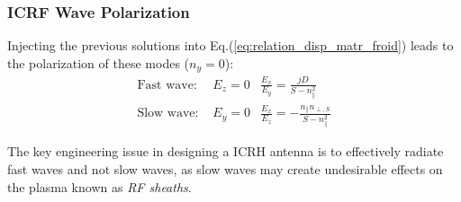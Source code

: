 \subsubsection{ICRF Wave Polarization}
Injecting the previous solutions into Eq.(\ref{eq:relation_disp_matr_froid}) leads to the polarization of these modes ($n_y=0$):
\begin{subequations}
	\begin{eqnarray}
		\mbox{Fast wave: } & E_z = 0 & \frac{E_x}{E_y}=\frac{j D}{S - n_\parallel^2} \\
		\mbox{Slow wave: } & E_y = 0 & \frac{E_x}{E_z}=- \frac{n_\parallel n_{\perp,S} }{S - n_\parallel^2}
	\end{eqnarray}
\end{subequations}

The key engineering issue in designing a ICRH antenna is to effectively radiate fast waves and not slow waves, as slow waves may create undesirable effects on the plasma known as \textit{RF sheaths}.

